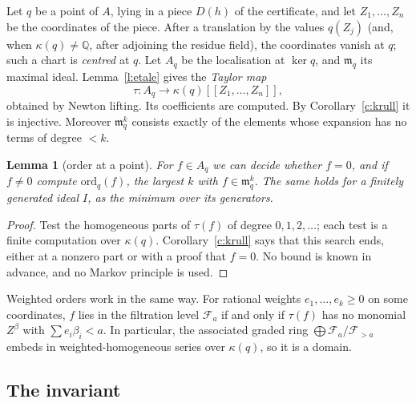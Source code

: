 \documentclass[11pt]{article}
\newcommand{\Q}{\mathbb{Q}}
\newcommand{\m}{\mathfrak{m}}
\newcommand{\cF}{\mathcal{F}}
\numberwithin{equation}{section}
\theoremstyle{plain}
\newtheorem{lemma}[theorem]{Lemma}
\theoremstyle{definition}
\theoremstyle{remark}
\begin{document}
Let $q$ be a point of $A$, lying in a piece $D(h)$ of the certificate, and let $Z_1,\dots,Z_n$ be the
coordinates of the piece. After a translation by the values $q(Z_j)$ (and, when $\kappa(q)\ne\Q$,
after adjoining the residue field), the coordinates vanish at $q$; such a chart is \emph{centred}
at $q$. Let $A_q$ be the localisation at $\ker q$, and $\m_q$ its maximal ideal. Lemma~\ref{l:etale}
gives the \emph{Taylor map}
\[
\tau:A_q\to\kappa(q)[[Z_1,\dots,Z_n]],
\]
obtained by Newton lifting. Its coefficients are computed. By Corollary~\ref{c:krull} it is
injective. Moreover $\m_q^k$ consists exactly of the elements whose expansion has no terms of degree
$<k$.

\begin{lemma}[order at a point]\label{l:ord}
For $f\in A_q$ we can decide whether $f=0$, and if $f\ne0$ compute $\mathrm{ord}_q(f)$, the largest
$k$ with $f\in\m_q^k$. The same holds for a finitely generated ideal $I$, as the minimum over its
generators.
\end{lemma}

\begin{proof}
Test the homogeneous parts of $\tau(f)$ of degree $0,1,2,\dots$; each test is a finite computation
over $\kappa(q)$. Corollary~\ref{c:krull} says that this search ends, either at a nonzero part or
with a proof that $f=0$. No bound is known in advance, and no Markov principle is used.
\end{proof}

Weighted orders work in the same way. For rational weights $e_1,\dots,e_k\ge0$ on some coordinates,
$f$ lies in the filtration level $\cF_a$ if and only if $\tau(f)$ has no monomial $Z^\beta$ with
$\sum e_i\beta_i<a$. In particular, the associated graded ring $\bigoplus\cF_a/\cF_{>a}$ embeds in
weighted-homogeneous series over $\kappa(q)$, so it is a domain.

\subsection{The invariant}
\end{document}

